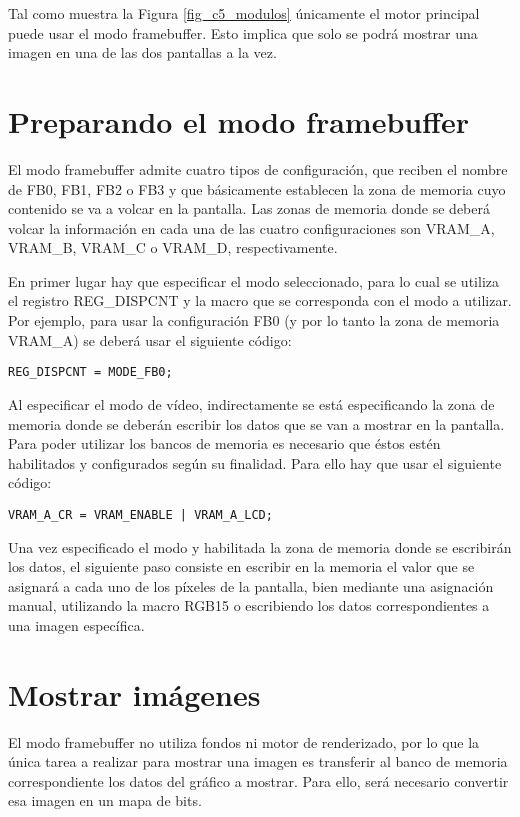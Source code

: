 Tal como muestra la Figura \ref{fig_c5_modulos} únicamente el motor principal puede usar el modo framebuffer. Esto implica que solo se podrá mostrar una imagen en una de las dos pantallas a la vez.
\section{Preparando el modo framebuffer}
El modo framebuffer admite cuatro tipos de configuración, que reciben el nombre de FB0, FB1, FB2 o FB3 y que básicamente establecen la zona de memoria cuyo contenido se va a volcar en la pantalla. Las zonas de memoria donde se deberá volcar la información en cada una de las cuatro configuraciones son VRAM\_A, VRAM\_B, VRAM\_C o VRAM\_D, respectivamente.

En primer lugar hay que especificar el modo seleccionado, para lo cual se utiliza el registro REG\_DISPCNT y la macro que se corresponda con el modo a utilizar. Por ejemplo, para usar la configuración FB0 (y por lo tanto la zona de memoria VRAM\_A) se deberá usar el siguiente código:

\begin{verbatim}
REG_DISPCNT = MODE_FB0;
\end{verbatim}

Al especificar el modo de vídeo, indirectamente se está especificando la zona de memoria donde se deberán escribir los datos que se van a mostrar en la pantalla. Para poder utilizar los bancos de memoria es necesario que éstos estén habilitados y configurados según su finalidad. Para ello hay que usar el siguiente código:

\begin{verbatim}
VRAM_A_CR = VRAM_ENABLE | VRAM_A_LCD;
\end{verbatim}

Una vez especificado el modo y habilitada la zona de memoria donde se escribirán los datos, el siguiente paso consiste en escribir en la memoria el valor que se asignará a cada uno de los píxeles de la pantalla, bien mediante una asignación manual, utilizando la macro RGB15 o escribiendo los datos correspondientes a una imagen específica.

\section{Mostrar imágenes}
\label{sec:p2_c3_imagenes}
El modo framebuffer no utiliza fondos ni motor de renderizado, por lo que la única tarea a realizar para mostrar una imagen es transferir al banco de memoria correspondiente los datos del gráfico a mostrar. Para ello, será necesario convertir esa imagen en un mapa de bits.

